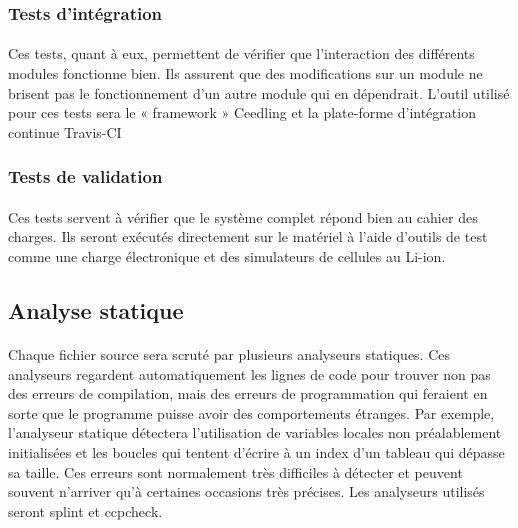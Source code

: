 		\subsubsection{Tests d'intégration}
	
			\paragraph{}
			Ces tests, quant à eux, permettent de vérifier que l’interaction des différents modules fonctionne bien. Ils assurent que des modifications sur un module ne brisent pas le fonctionnement d’un autre module qui en dépendrait. L’outil utilisé pour ces tests sera le « framework » Ceedling et la  plate-forme d’intégration continue Travis-CI
		
		\subsubsection{Tests de validation}
	
			\paragraph{}
			Ces tests servent à vérifier que le système complet répond bien au cahier des charges. Ils seront exécutés directement sur le matériel à l’aide d’outils de test comme une charge électronique et des simulateurs de cellules au Li-ion.
	
	\subsection{Analyse statique}

		\paragraph{}
		Chaque fichier source sera scruté par plusieurs analyseurs statiques. Ces analyseurs regardent automatiquement les lignes de code pour trouver non pas des erreurs de compilation, mais des erreurs de programmation qui feraient en sorte que le programme puisse avoir des comportements étranges. Par exemple, l’analyseur statique détectera l’utilisation de variables locales non préalablement initialisées et les boucles qui tentent d’écrire à un index d’un tableau qui dépasse sa taille. Ces erreurs sont normalement très difficiles à détecter et peuvent souvent n’arriver qu’à certaines occasions très précises. Les analyseurs utilisés seront splint et ccpcheck.
	
